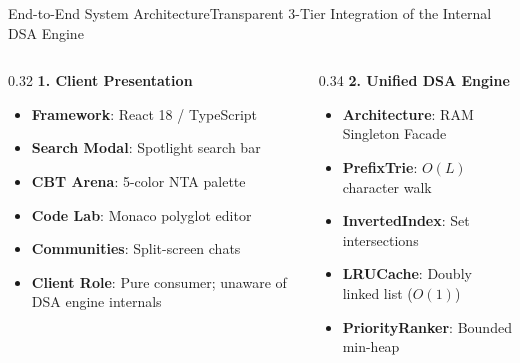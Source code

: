 \documentclass[aspectratio=169,10pt]{beamer}
\begin{document}
\begin{frame}[t]{End-to-End System Architecture}{Transparent 3-Tier Integration of the Internal DSA Engine}
  \begin{columns}[t]
    \begin{column}{0.32\textwidth}
      {\fontsize{8.5}{10.5}\selectfont\textbf{\textcolor{KoinexaRed}{1. Client Presentation}}}\par\vspace{1.5pt}
      \begin{itemize}\setlength{\itemsep}{1.2pt}
        \item {\fontsize{7.5}{9.2}\selectfont \textbf{Framework}: React 18 / TypeScript}
        \item {\fontsize{7.5}{9.2}\selectfont \textbf{Search Modal}: Spotlight search bar}
        \item {\fontsize{7.5}{9.2}\selectfont \textbf{CBT Arena}: 5-color NTA palette}
        \item {\fontsize{7.5}{9.2}\selectfont \textbf{Code Lab}: Monaco polyglot editor}
        \item {\fontsize{7.5}{9.2}\selectfont \textbf{Communities}: Split-screen chats}
        \item {\fontsize{7.5}{9.2}\selectfont \textbf{Client Role}: Pure consumer; unaware of DSA engine internals}
      \end{itemize}
    \end{column}
    \begin{column}{0.34\textwidth}
      {\fontsize{8.5}{10.5}\selectfont\textbf{\textcolor{KoinexaOrange}{2. Unified DSA Engine}}}\par\vspace{1.5pt}
      \begin{itemize}\setlength{\itemsep}{1.2pt}
        \item {\fontsize{7.5}{9.2}\selectfont \textbf{Architecture}: RAM Singleton Facade}
        \item {\fontsize{7.5}{9.2}\selectfont \textbf{PrefixTrie}: $O(L)$ character walk}
        \item {\fontsize{7.5}{9.2}\selectfont \textbf{InvertedIndex}: Set intersections}
        \item {\fontsize{7.5}{9.2}\selectfont \textbf{LRUCache}: Doubly linked list ($O(1)$)}
        \item {\fontsize{7.5}{9.2}\selectfont \textbf{PriorityRanker}: Bounded min-heap}

\end{itemize}
\end{column}
\end{columns}
\end{frame}
\end{document}
